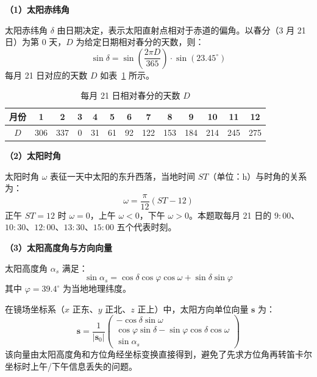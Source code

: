 \documentclass[12pt,a4paper,fontset=fandol]{ctexart}
\begin{document}
\textbf{（1）太阳赤纬角}

太阳赤纬角 $\delta$ 由日期决定，表示太阳直射点相对于赤道的偏角。以春分（3 月 21 日）为第 $0$ 天，$D$ 为给定日期相对春分的天数，则：
\begin{equation}
    \sin\delta = \sin\!\left(\frac{2\pi D}{365}\right) \cdot \sin(23.45^{\circ})
    \label{eq:declination}
\end{equation}
每月 21 日对应的天数 $D$ 如表~\ref{tab:month_D} 所示。

\begin{table}[H]
    \centering
    \caption{每月 21 日相对春分的天数 $D$}
    \label{tab:month_D}
    \small
    \begin{tabular}{ccccccccccccc}
        \toprule
        月份 & 1 & 2 & 3 & 4 & 5 & 6 & 7 & 8 & 9 & 10 & 11 & 12 \\
        \midrule
        $D$ & 306 & 337 & 0 & 31 & 61 & 92 & 122 & 153 & 184 & 214 & 245 & 275 \\
        \bottomrule
    \end{tabular}
\end{table}

\textbf{（2）太阳时角}

太阳时角 $\omega$ 表征一天中太阳的东升西落，当地时间 $ST$（单位：h）与时角的关系为：
\begin{equation}
    \omega = \frac{\pi}{12}(ST - 12)
    \label{eq:hour_angle}
\end{equation}
正午 $ST=12$ 时 $\omega=0$，上午 $\omega<0$，下午 $\omega>0$。本题取每月 21 日的 $9{:}00$、$10{:}30$、$12{:}00$、$13{:}30$、$15{:}00$ 五个代表时刻。

\textbf{（3）太阳高度角与方向向量}

太阳高度角 $\alpha_s$ 满足：
\begin{equation}
    \sin\alpha_s = \cos\delta\cos\varphi\cos\omega + \sin\delta\sin\varphi
    \label{eq:altitude}
\end{equation}
其中 $\varphi = 39.4^{\circ}$ 为当地地理纬度。

在镜场坐标系（$x$ 正东、$y$ 正北、$z$ 正上）中，太阳方向单位向量 $\mathbf{s}$ 为：
\begin{equation}
    \mathbf{s} = \frac{1}{|\mathbf{s}_0|}\begin{pmatrix} -\cos\delta\sin\omega \\ \cos\varphi\sin\delta - \sin\varphi\cos\delta\cos\omega \\ \sin\alpha_s \end{pmatrix}
    \label{eq:sun_vector}
\end{equation}
该向量由太阳高度角和方位角经坐标变换直接得到，避免了先求方位角再转笛卡尔坐标时上午/下午信息丢失的问题。
\end{document}
